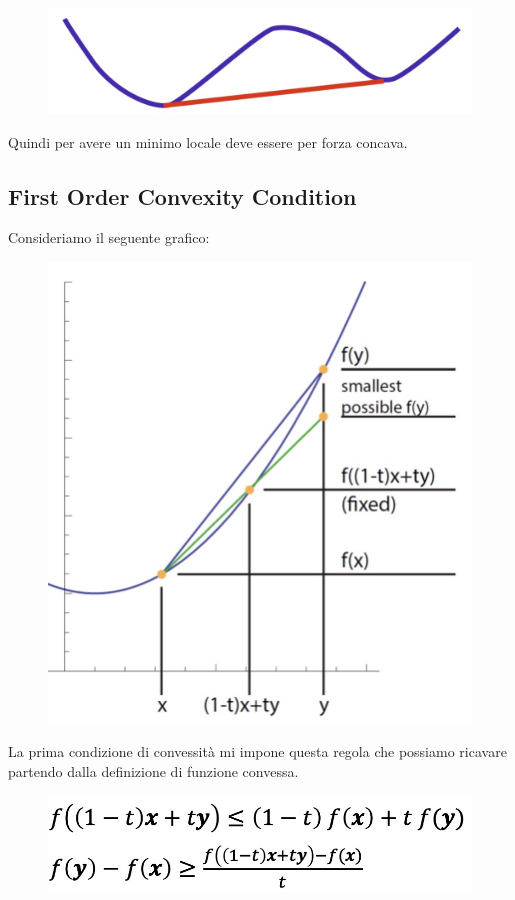 \documentclass[14pt]{extreport}
\begin{document}
\begin{figure}[H]
\centering
\includegraphics[width=0.7\linewidth]{220.jpeg}
\end{figure}

Quindi per avere un minimo locale deve essere per forza concava.

\subsection{First Order Convexity Condition}

Consideriamo il seguente grafico:

\begin{figure}[H]
\centering
\includegraphics[width=0.7\linewidth]{221.jpeg}
\end{figure}

La prima condizione di convessità mi impone questa regola che possiamo ricavare partendo dalla definizione di funzione convessa.

\begin{figure}[H]
\centering
\includegraphics[width=0.7\linewidth]{222.jpeg}
\end{figure}
\end{document}
